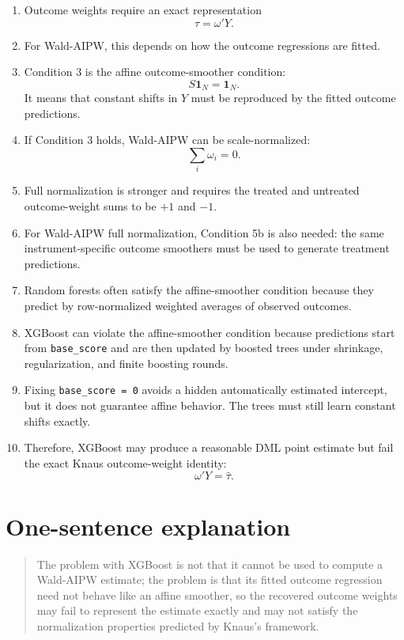 \documentclass[11pt,a4paper]{article}
\begin{document}
\begin{enumerate}[label=\arabic*.]
    \item Outcome weights require an exact representation
    \[
        \hat\tau=\omega'Y.
    \]

    \item For Wald-AIPW, this depends on how the outcome regressions are fitted.

    \item Condition 3 is the affine outcome-smoother condition:
    \[
        S\mathbf{1}_N=\mathbf{1}_N.
    \]
    It means that constant shifts in \(Y\) must be reproduced by the fitted
    outcome predictions.

    \item If Condition 3 holds, Wald-AIPW can be scale-normalized:
    \[
        \sum_i\omega_i=0.
    \]

    \item Full normalization is stronger and requires the treated and untreated
    outcome-weight sums to be \(+1\) and \(-1\).

    \item For Wald-AIPW full normalization, Condition 5b is also needed: the same
    instrument-specific outcome smoothers must be used to generate treatment
    predictions.

    \item Random forests often satisfy the affine-smoother condition because they
    predict by row-normalized weighted averages of observed outcomes.

    \item XGBoost can violate the affine-smoother condition because predictions
    start from \texttt{base\_score} and are then updated by boosted trees under
    shrinkage, regularization, and finite boosting rounds.

    \item Fixing \texttt{base\_score = 0} avoids a hidden automatically estimated
    intercept, but it does not guarantee affine behavior. The trees must still
    learn constant shifts exactly.

    \item Therefore, XGBoost may produce a reasonable DML point estimate but fail
    the exact Knaus outcome-weight identity:
    \[
        \omega'Y=\hat\tau.
    \]
\end{enumerate}

\section{One-sentence explanation}

\begin{quote}
The problem with XGBoost is not that it cannot be used to compute a Wald-AIPW
estimate; the problem is that its fitted outcome regression need not behave like
an affine smoother, so the recovered outcome weights may fail to represent the
estimate exactly and may not satisfy the normalization properties predicted by
Knaus's framework.
\end{quote}
\end{document}

